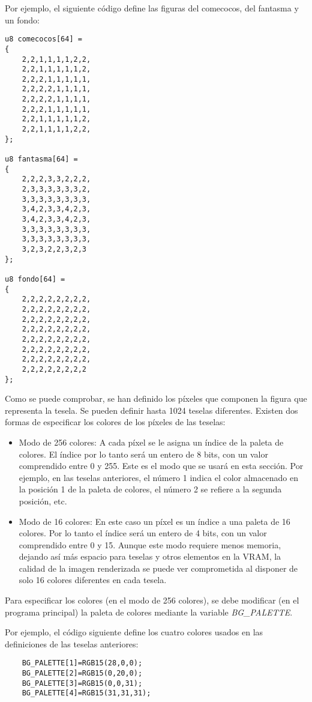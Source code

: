 \begin{example}
Por ejemplo, el siguiente código define las figuras del comecocos, del fantasma y un fondo:

\begin{lstlisting}
u8 comecocos[64] =
{
	2,2,1,1,1,1,2,2,
	2,2,1,1,1,1,1,2,
	2,2,2,1,1,1,1,1,
	2,2,2,2,1,1,1,1,
	2,2,2,2,1,1,1,1,
	2,2,2,1,1,1,1,1,
	2,2,1,1,1,1,1,2,
	2,2,1,1,1,1,2,2,
};

u8 fantasma[64] =
{
	2,2,2,3,3,2,2,2,
	2,3,3,3,3,3,3,2,
	3,3,3,3,3,3,3,3,
	3,4,2,3,3,4,2,3,
	3,4,2,3,3,4,2,3,
	3,3,3,3,3,3,3,3,
	3,3,3,3,3,3,3,3,
	3,2,3,2,2,3,2,3
};

u8 fondo[64] =
{
	2,2,2,2,2,2,2,2,
	2,2,2,2,2,2,2,2,
	2,2,2,2,2,2,2,2,
	2,2,2,2,2,2,2,2,
	2,2,2,2,2,2,2,2,
	2,2,2,2,2,2,2,2,
	2,2,2,2,2,2,2,2,
	2,2,2,2,2,2,2,2
};
\end{lstlisting}
\end{example}

Como se puede comprobar, se han definido los píxeles que componen la figura que representa la tesela. Se pueden definir hasta 1024 teselas diferentes. Existen dos formas de especificar los colores de los píxeles de las teselas:

\begin{itemize}
\item Modo de 256 colores: A cada píxel se le asigna un índice de la paleta de colores. El índice por lo tanto será un entero de 8 bits, con un valor comprendido entre 0 y 255. Este es el modo que se usará en esta sección. Por ejemplo, en las teselas anteriores, el número 1 indica el color almacenado en la posición 1 de la paleta de colores, el número 2 se refiere a la segunda posición, etc. 
%
\item Modo de 16 colores: En este caso un píxel es un índice a una paleta de 16 colores. Por lo tanto el índice será un entero de 4 bits, con un valor comprendido entre 0 y 15. Aunque este modo requiere menos memoria, dejando así más espacio para teselas y otros elementos en la VRAM, la calidad de la imagen renderizada se puede ver comprometida al disponer de solo 16 colores diferentes en cada tesela.
\end{itemize}

Para especificar los colores (en el modo de 256 colores), se debe modificar (en el programa principal) la paleta de colores mediante la variable \textit{BG\_PALETTE}. 

\begin{example}
Por ejemplo, el código siguiente define los cuatro colores usados en las definiciones de las teselas anteriores:

\begin{lstlisting}
	BG_PALETTE[1]=RGB15(28,0,0);
	BG_PALETTE[2]=RGB15(0,20,0);
	BG_PALETTE[3]=RGB15(0,0,31);
	BG_PALETTE[4]=RGB15(31,31,31);
\end{lstlisting}
\end{example}
	

